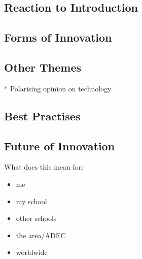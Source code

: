 \subsection{Reaction to Introduction}

\subsection{Forms of Innovation}

\subsection{Other Themes}
* Polarising opinion on technology

\subsection{Best Practises}

\subsection{Future of Innovation}


What does this mean for:
\begin{itemize}
\item me
\item my school
\item other schools
\item the area/ADEC
\item worldwide
\end{itemize}